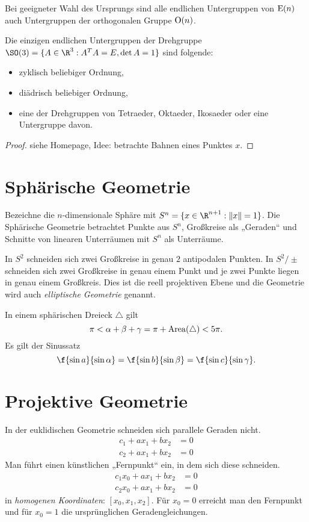 \begin{kor}
	Bei geeigneter Wahl des Ursprungs sind alle endlichen Untergruppen von $\operatorname{E}(n)$ auch Untergruppen der orthogonalen Gruppe $\operatorname{O}(n)$.
\end{kor}

\begin{st}
	Die einzigen endlichen Untergruppen der Drehgruppe $\SO (3) = \{ A \in \R^3 : A^TA = E, \det A = 1 \}$ sind folgende:
	\begin{itemize}
		\item
			zyklisch beliebiger Ordnung,
		\item
			diädrisch beliebiger Ordnung,
		\item
			eine der Drehgruppen von Tetraeder, Oktaeder, Ikosaeder oder eine Untergruppe davon.
	\end{itemize}
	\begin{proof}
		siehe Homepage, Idee: betrachte Bahnen eines Punktes $x$.
	\end{proof}
\end{st}


\section{Sphärische Geometrie}


Bezeichne die $n$-dimensionale Sphäre mit $S^n = \{ x \in \R^{n+1} : \|x\| = 1 \}$.
Die Sphärische Geometrie betrachtet Punkte aus $S^n$, Großkreise als „Geraden“ und Schnitte von linearen Unterräumen mit $S^n$ als Unterräume.

In $S^2$ schneiden sich zwei Großkreise in genau $2$ antipodalen Punkten.
In $S^2 / \pm$ schneiden sich zwei Großkreise in genau einem Punkt und je zwei Punkte liegen in genau einem Großkreis.
Dies ist die reell projektiven Ebene und die Geometrie wird auch \emph{elliptische Geometrie} genannt.

In einem sphärischen Dreieck $\triangle$ gilt
\[
	\pi
	< \alpha + \beta + \gamma
	= \pi + \operatorname{Area}(\triangle)
	< 5 \pi.
\]
Es gilt der Sinussatz
\[
	\f {\sin a}{\sin \alpha}
	= \f {\sin b}{\sin \beta}
	= \f {\sin c}{\sin \gamma}.
\]



\section{Projektive Geometrie}


In der euklidischen Geometrie schneiden sich parallele Geraden nicht.
\begin{align*}
	c_1 + ax_1 + bx_2 &= 0 \\
	c_2 + ax_1 + bx_2 &= 0
\end{align*}
Man führt einen künstlichen „Fernpunkt“ ein, in dem sich diese schneiden.
\begin{align*}
	c_1 x_0 + a x_1 + b x_2 &= 0 \\
	c_2 x_0 + a x_1 + b x_2 &= 0
\end{align*}
in \emph{homogenen Koordinaten}: $[x_0, x_1, x_2]$.
Für $x_0 = 0$ erreicht man den Fernpunkt und für $x_0 = 1$ die ursprünglichen Geradengleichungen.


